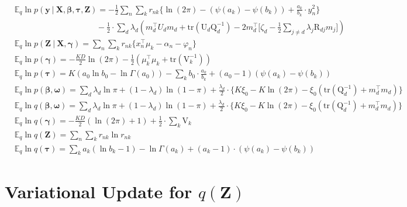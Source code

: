 \documentclass[twoside,11pt]{article}
\newcommand\given[1][]{\:#1\vert\:}
\newcommand{\transpose}[1]{#1^{\intercal}}
\newcommand{\nsum}{\sum\limits_{n}}
\newcommand{\ksum}{\sum\limits_{k}}
\newcommand{\boldbeta}{\boldsymbol\beta}
\newcommand{\boldgamma}{\boldsymbol\gamma}
\newcommand{\boldomega}{\boldsymbol\omega}
\newcommand{\boldtau}{\boldsymbol\tau}
\newcommand{\E}{\mathbb{E}}
\newcommand{\qmat}{\mathrm{Q}}
\newcommand{\trace}[1]{\mathrm{tr} \left( #1 \right)}
\begin{document}
\begin{align*}
	& \E_q \ln p\left( \mathbf{y} \given \mathbf{X}, \boldbeta, \boldtau, \mathbf{Z} \right) = - \frac{1}{2} \nsum \ksum r_{nk} \Big\{  \ln(2\pi) - (\psi(a_k) - \psi(b_k)) + \frac{a_k}{b_k} \cdot y_n^2 \Big\} \\ & \qquad \qquad \qquad\qquad \qquad - \frac{1}{2} \cdot \sum_d \lambda_d \left( \transpose{m_d} U_d m_d + \trace{\mathrm{U}_d \mathrm{Q}_d^{-1}} - 2\transpose{m_d} \Bigg[ \zeta_d - \frac{1}{2} \sum_{j\neq d} \lambda_j \mathrm{R}_{dj} m_j\Bigg] \right)\\
	& \E_q \ln p\left( \mathbf{Z} \given \mathbf{X}, \boldgamma \right)  = \nsum \ksum r_{nk} \Big\{ \transpose{x_n} \mu_k - \alpha_n - \varphi_n \Big\}\\
	& \E_q \ln p\left( \boldgamma \right) = -\frac{KD}{2} \ln(2\pi) - \frac{1}{2} \left( \transpose{\mu_k} \mu_k + \trace{\mathrm{V}_k^{-1}} \right) \\
	& \E_q \ln p\left( \boldtau \right) = K \left( a_0 \ln b_0 - \ln \Gamma(a_0) \right) - \ksum b_0 \cdot \frac{a_k}{b_k} + (a_0 - 1) \left( \psi(a_k) - \psi(b_k) \right) \\
	& \E_q \ln p\left( \boldbeta, \boldomega \right) = \sum_d \lambda_d \ln \pi + (1 - \lambda_d) \ln (1 - \pi) + \frac{\lambda_d}{2} \cdot \Big\{ K \xi_0 - K \ln (2 \pi) - \xi_0 \left( \trace{\qmat_d^{-1}} + \transpose{m_d}m_d \right) \Big\} \\
	& \E_q \ln q\left( \boldbeta, \boldomega \right) = \sum_d \lambda_d \ln \pi + (1 - \lambda_d) \ln (1 - \pi) + \frac{\lambda_d}{2} \cdot \Big\{ K \xi_0 - K \ln (2 \pi) - \xi_0 \left( \trace{\qmat_d^{-1}} + \transpose{m_d}m_d \right) \Big\}\\
	& \E_q \ln q\left( \boldgamma \right) = - \frac{KD}{2} \left( \ln(2\pi) + 1 \right) + \frac{1}{2} \cdot \ksum \mathrm{V}_k \\
	& \E_q \ln q\left( \mathbf{Z} \right) = \nsum \ksum r_{nk} \ln r_{nk} \\
	& \E_q \ln q\left( \mathbf{\tau} \right) = \ksum a_k \left( \ln b_k - 1 \right) - \ln \Gamma(a_k)  + (a_k - 1) \cdot \left( \psi(a_k) - \psi(b_k) \right)
\end{align*}





\newpage

\appendix
\section{Variational Update for $q(\mathbf{Z})$} 
\label{app:q_z}
\end{document}
